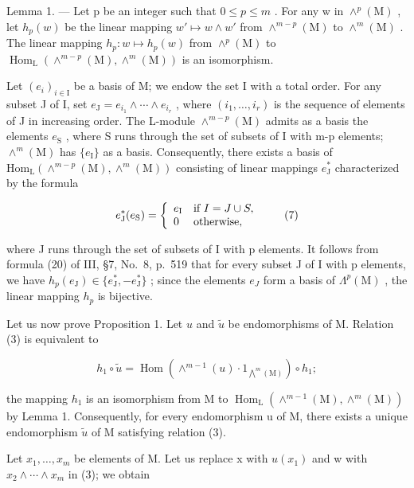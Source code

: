 Lemma 1. --- Let p be an integer such that \(0 \leqslant p \leqslant m\) . For any w in \(\wedge^{p}(\mathrm{M})\) , let \(h_{p}(w)\) be the linear mapping \(w' \mapsto w \wedge w'\) from \(\wedge^{m-p}(\mathrm{M})\) to \(\wedge^{m}(\mathrm{M})\) . The linear mapping \(h_{p}: w \mapsto h_{p}(w)\) from \(\wedge^{p}(\mathrm{M})\) to \(\operatorname{Hom}_{\mathrm{L}}(\wedge^{m-p}(\mathrm{M}), \wedge^{m}(\mathrm{M}))\) is an isomorphism.

Let \((e_{i})_{i\in\mathrm{I}}\) be a basis of M; we endow the set I with a total order. For any subset J of I, set \(e_{\mathrm{J}}=e_{i_{1}}\wedge\cdots\wedge e_{i_{r}}\) , where \((i_{1},\ldots,i_{r})\) is the sequence of elements of J in increasing order. The L-module \(\wedge^{m-p}(\mathrm{M})\) admits as a basis the elements \(e_{\mathrm{S}}\) , where S runs through the set of subsets of I with m-p elements; \(\wedge^{m}(\mathrm{M})\) has \(\{e_{\mathrm{I}}\}\) as a basis. Consequently, there exists a basis of \(\mathrm{Hom}_{\mathrm{L}}(\wedge^{m-p}(\mathrm{M}),\wedge^{m}(\mathrm{M}))\) consisting of linear mappings \(e_{\mathrm{J}}^{*}\) characterized by the formula

\[
e _ {\mathrm{J}} ^ {*} (e _ {\mathrm{S}}) = \left\{ \begin{array}{l l} e _ {\mathrm{I}} & \text {if } I = J\cup S, \\ 0 & \text {otherwise}, \end{array} \right.\tag{7}
\]

where J runs through the set of subsets of I with p elements. It follows from formula (20) of III, §7, No.~8, p.~519 that for every subset J of I with p elements, we have \(h_{p}(e_{\mathrm{J}}) \in \{e_{\mathrm{J}}^{*}, -e_{\mathrm{J}}^{*}\}\) ; since the elements \(e_{J}\) form a basis of \(\Lambda^{p}(\mathrm{M})\) , the linear mapping \(h_{p}\) is bijective.

Let us now prove Proposition 1. Let \(u\) and \(\widetilde{u}\) be endomorphisms of M. Relation (3) is equivalent to

\[
h _ {1} \circ \widetilde {u} = \operatorname{Hom} (\wedge^ {m - 1} (u) \cdot 1 _ {\bigwedge^ {m} (\mathrm{M})}) \circ h _ {1};\tag{8}
\]

the mapping \(h_{1}\) is an isomorphism from M to \(\operatorname{Hom}_{\mathrm{L}}(\wedge^{m-1}(\mathrm{M}),\wedge^{m}(\mathrm{M}))\) by Lemma 1. Consequently, for every endomorphism u of M, there exists a unique endomorphism \(\widetilde{u}\) of M satisfying relation (3).

Let \(x_{1},\ldots,x_{m}\) be elements of M. Let us replace x with \(u(x_{1})\) and w with \(x_{2}\wedge\cdots\wedge x_{m}\) in (3); we obtain

